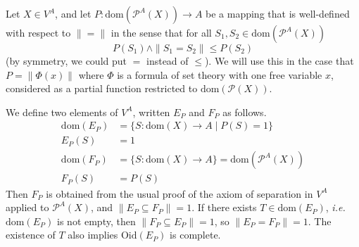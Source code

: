 \documentclass{lmcs}
\newcommand{\dom}{\ensuremath{\mathrm{dom}}}
\newcommand{\powerset}{\ensuremath{\mathcal{P}}}
\newcommand{\apowerset}{\powerset^A}
\newcommand{\beq}{\|\mbox{$=$}\|}
\newcommand{\Oid}{\mathrm{Oid}}
\newcommand{\bvs}[1]{\| {#1} \|}
\begin{document}
\begin{lem}
\label{DefeatingEmptySetLemma}
Let $X \in V^A$, and let $P : \dom(\apowerset(X)) \rightarrow A$ be a mapping that is well-defined with respect to $\beq$ in the sense that for all $S_1,S_2 \in \dom(\apowerset(X))$
\[
P(S_1) \land \bvs{S_1 = S_2} \leq P(S_2)
\]
(by symmetry, we could put $=$ instead of $\leq$). We will use this in the case that $P = \bvs{\Phi(x)}$ where $\Phi$ is a formula of set theory with one free variable $x$, considered as a partial function restricted to $\dom(\powerset(X))$. 

We define two elements of $V^A$, written $E_P$ and $F_P$ as follows.
\begin{align*}
\dom(E_P) &= \{ S : \dom(X) \rightarrow A \mid P(S) = 1 \} \\ 
E_P(S) &= 1 \\
\dom(F_P) &= \{ S : \dom(X) \rightarrow A \} = \dom(\apowerset(X)) \\
F_P(S) &= P(S)
\end{align*}
Then $F_P$ is obtained from the usual proof of the axiom of separation in $V^A$ applied to $\apowerset(X)$, and $\bvs{E_P \subseteq F_P} = 1$. If there exists $T \in \dom(E_P)$, \emph{i.e.} $\dom(E_P)$ is not empty, then $\bvs{F_P \subseteq E_P} = 1$, so $\bvs{E_P = F_P} = 1$. The existence of $T$ also implies $\Oid(E_P)$ is complete. 
\end{lem}
\end{document}
